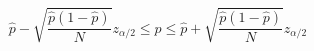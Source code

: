 

\[
\hat{p} - \sqrt{\frac{\hat{p}(1 - \hat{p})}{N}} z_{\alpha/2} \le p \le \hat{p} + \sqrt{\frac{\hat{p}(1 - \hat{p})}{N}} z_{\alpha/2}
\]


